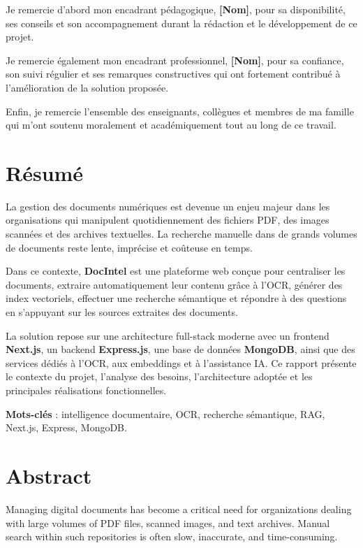 \documentclass[12pt,a4paper]{report}
\begin{document}
Je remercie d'abord mon encadrant pédagogique, \textbf{[Nom]}, pour sa disponibilité, ses conseils et son accompagnement durant la rédaction et le développement de ce projet.

Je remercie également mon encadrant professionnel, \textbf{[Nom]}, pour sa confiance, son suivi régulier et ses remarques constructives qui ont fortement contribué à l'amélioration de la solution proposée.

Enfin, je remercie l'ensemble des enseignants, collègues et membres de ma famille qui m'ont soutenu moralement et académiquement tout au long de ce travail.

\chapter*{Résumé}
La gestion des documents numériques est devenue un enjeu majeur dans les organisations qui manipulent quotidiennement des fichiers PDF, des images scannées et des archives textuelles. La recherche manuelle dans de grands volumes de documents reste lente, imprécise et coûteuse en temps.

Dans ce contexte, \textbf{DocIntel} est une plateforme web conçue pour centraliser les documents, extraire automatiquement leur contenu grâce à l'OCR, générer des index vectoriels, effectuer une recherche sémantique et répondre à des questions en s'appuyant sur les sources extraites des documents.

La solution repose sur une architecture full-stack moderne avec un frontend \textbf{Next.js}, un backend \textbf{Express.js}, une base de données \textbf{MongoDB}, ainsi que des services dédiés à l'OCR, aux embeddings et à l'assistance IA. Ce rapport présente le contexte du projet, l'analyse des besoins, l'architecture adoptée et les principales réalisations fonctionnelles.

\textbf{Mots-clés} : intelligence documentaire, OCR, recherche sémantique, RAG, Next.js, Express, MongoDB.

\chapter*{Abstract}
Managing digital documents has become a critical need for organizations dealing with large volumes of PDF files, scanned images, and text archives. Manual search within such repositories is often slow, inaccurate, and time-consuming.
\end{document}
